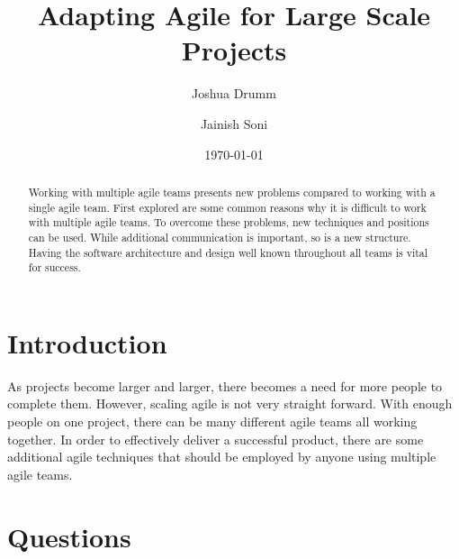 \documentclass[sigplan,screen]{acmart}
\begin{document}
\title{Adapting Agile for Large Scale Projects}

\author{Joshua Drumm}

\author{Jainish Soni}

\date{\today}

\begin{abstract}
Working with multiple agile teams presents new problems compared to working with a single agile team. First explored are some common reasons why it is difficult to work with multiple agile teams. To overcome these problems, new techniques and positions can be used. While additional communication is important, so is a new structure. Having the software architecture and design well known throughout all teams is vital for success.
\end{abstract}


\maketitle


\section{Introduction}
As projects become larger and larger, there becomes a need for more people to complete them. However, scaling agile is not very straight forward. With enough people on one project, there can be many different agile teams all working together. In order to effectively deliver a successful product, there are some additional agile techniques that should be employed by anyone using multiple agile teams.

\section{Questions}
\end{document}
